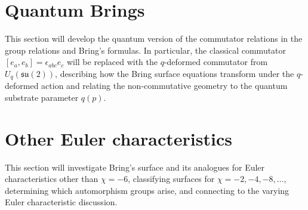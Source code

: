 \section{Quantum Brings}
\label{sec:quantum-brings}

This section will develop the quantum version of the commutator relations in the group relations and Bring's formulas. In particular, the classical commutator $[e_a,e_b] = \epsilon_{abc} e_c$ will be replaced with the $q$-deformed commutator from $U_q(\mathfrak{su}(2))$, describing how the Bring surface equations transform under the $q$-deformed action and relating the non-commutative geometry to the quantum substrate parameter $q(p)$.

\section{Other Euler characteristics}
\label{sec:other-euler}

This section will investigate Bring's surface and its analogues for Euler characteristics other than $\chi = -6$, classifying surfaces for $\chi = -2, -4, -8, \ldots$, determining which automorphism groups arise, and connecting to the varying Euler characteristic discussion.
